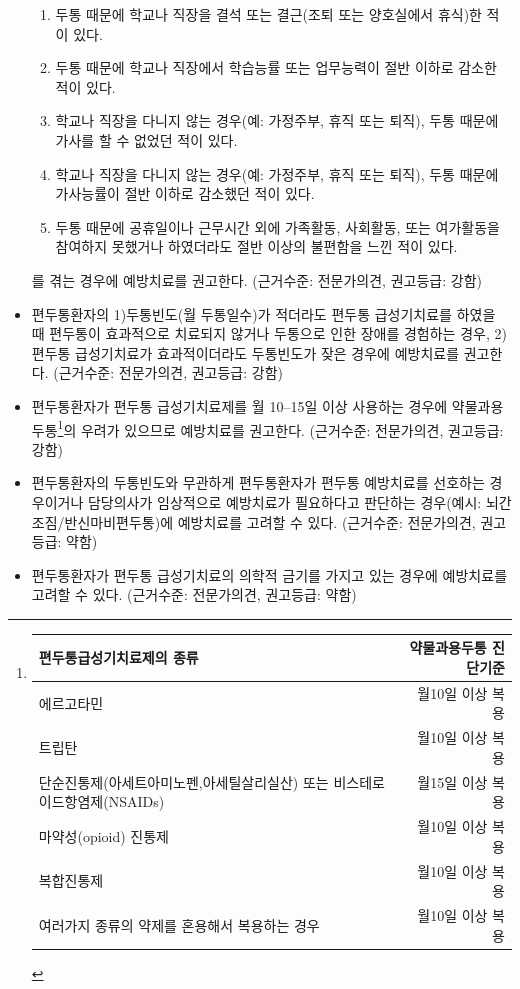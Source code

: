 \documentclass[]{book}
\providecommand{\tightlist}{%
  \setlength{\itemsep}{0pt}\setlength{\parskip}{0pt}}
\let\rmarkdownfootnote\footnote%
\def\footnote{\protect\rmarkdownfootnote}
\begin{document}
\begin{itemize}
{    \begin{enumerate}
    \def\labelenumi{\arabic{enumi}.}
    \tightlist
    \item
      두통 때문에 학교나 직장을 결석 또는 결근(조퇴 또는 양호실에서 휴식)한 적이 있다.
    \item
      두통 때문에 학교나 직장에서 학습능률 또는 업무능력이 절반 이하로 감소한 적이 있다.
    \item
      학교나 직장을 다니지 않는 경우(예: 가정주부, 휴직 또는 퇴직), 두통 때문에 가사를 할 수 없었던 적이 있다.
    \item
      학교나 직장을 다니지 않는 경우(예: 가정주부, 휴직 또는 퇴직), 두통 때문에 가사능률이 절반 이하로 감소했던 적이 있다.
    \item
      두통 때문에 공휴일이나 근무시간 외에 가족활동, 사회활동, 또는 여가활동을 참여하지 못했거나 하였더라도 절반 이상의 불편함을 느낀 적이 있다.
    \end{enumerate}}를 겪는 경우에 예방치료를 권고한다. (근거수준: 전문가의견, 권고등급: 강함)
\item
  편두통환자의 1)두통빈도(월 두통일수)가 적더라도 편두통 급성기치료를 하였을 때 편두통이 효과적으로 치료되지 않거나 두통으로 인한 장애를 경험하는 경우, 2)편두통 급성기치료가 효과적이더라도 두통빈도가 잦은 경우에 예방치료를 권고한다. (근거수준: 전문가의견, 권고등급: 강함)
\item
  편두통환자가 편두통 급성기치료제를 월 10--15일 이상 사용하는 경우에 약물과용두통\footnote{\begin{longtable}[]{@{}lr@{}}
    \toprule
    편두통급성기치료제의 종류 & 약물과용두통 진단기준\tabularnewline
    \midrule
    \endhead
    에르고타민 & 월10일 이상 복용\tabularnewline
    트립탄 & 월10일 이상 복용\tabularnewline
    단순진통제(아세트아미노펜,아세틸살리실산) 또는 비스테로이드항염제(NSAIDs) & 월15일 이상 복용\tabularnewline
    마약성(opioid) 진통제 & 월10일 이상 복용\tabularnewline
    복합진통제 & 월10일 이상 복용\tabularnewline
    여러가지 종류의 약제를 혼용해서 복용하는 경우 & 월10일 이상 복용\tabularnewline
    \bottomrule
    \end{longtable}}의 우려가 있으므로 예방치료를 권고한다. (근거수준: 전문가의견, 권고등급: 강함)
\item
  편두통환자의 두통빈도와 무관하게 편두통환자가 편두통 예방치료를 선호하는 경우이거나 담당의사가 임상적으로 예방치료가 필요하다고 판단하는 경우(예시: 뇌간조짐/반신마비편두통)에 예방치료를 고려할 수 있다. (근거수준: 전문가의견, 권고등급: 약함)
\item
  편두통환자가 편두통 급성기치료의 의학적 금기를 가지고 있는 경우에 예방치료를 고려할 수 있다. (근거수준: 전문가의견, 권고등급: 약함)
\end{itemize}
\end{document}
